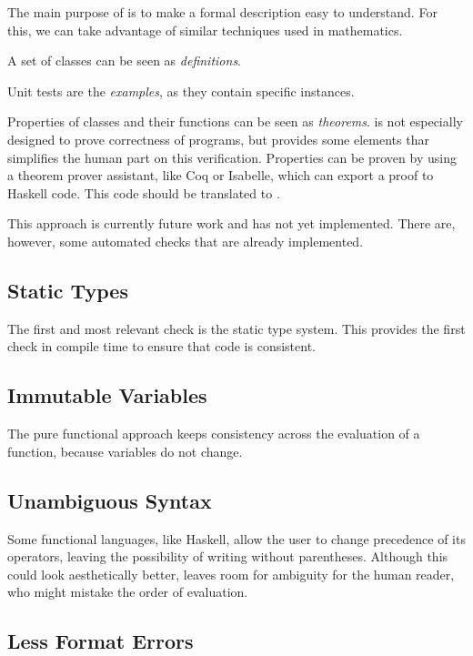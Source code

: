 The main purpose of \Soda is to make a formal description easy to understand.
For this, we can take advantage of similar techniques used in mathematics.

A set of \Soda classes can be seen as \textit{definitions}.

Unit tests are the \textit{examples}, as they contain specific instances.

Properties of classes and their functions can be seen as \textit{theorems}.
\Soda is not especially designed to prove correctness of programs, but provides some elements thar simplifies the human part on this verification.
Properties can be proven by using a theorem prover assistant, like Coq or Isabelle, which can export a proof to Haskell code.
This code should be translated to \Soda.

This approach is currently future work and has not yet implemented.
There are, however, some automated checks that are already implemented.

\subsection{Static Types}

The first and most relevant check is the static type system.
This provides the first check in compile time to ensure that \Soda code is consistent.

\subsection{Immutable Variables}

The pure functional approach keeps consistency across the evaluation of a function, because variables do not change.

\subsection{Unambiguous Syntax}

Some functional languages, like Haskell, allow the user to change precedence of its operators, leaving the possibility of writing without parentheses.
Although this could look aesthetically better, leaves room for ambiguity for the human reader, who might mistake the order of evaluation.

\subsection{Less Format Errors}

